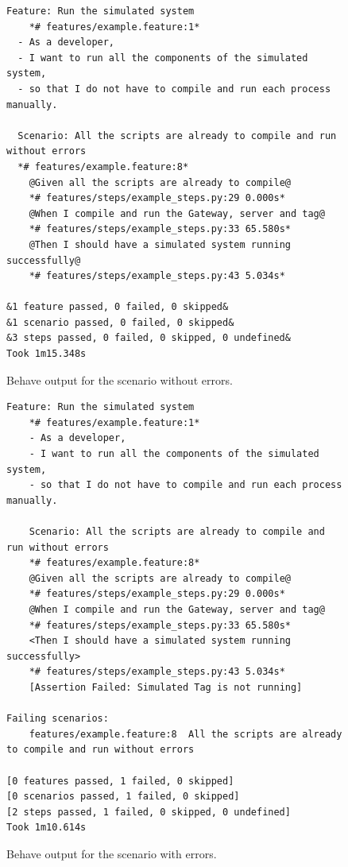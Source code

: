 \documentclass[journal]{IEEEtran}	%
\begin{document}
\begin{figure}[t!]
\centering
\begin{lstlisting}[style=okstyle]
Feature: Run the simulated system 
    *# features/example.feature:1*
  - As a developer,
  - I want to run all the components of the simulated system,
  - so that I do not have to compile and run each process manually.

  Scenario: All the scripts are already to compile and run without errors  
  *# features/example.feature:8*
    @Given all the scripts are already to compile@                           
    *# features/steps/example_steps.py:29 0.000s*
    @When I compile and run the Gateway, server and tag@                    
    *# features/steps/example_steps.py:33 65.580s*
    @Then I should have a simulated system running successfully@             
    *# features/steps/example_steps.py:43 5.034s*

&1 feature passed, 0 failed, 0 skipped&
&1 scenario passed, 0 failed, 0 skipped&
&3 steps passed, 0 failed, 0 skipped, 0 undefined&
Took 1m15.348s
\end{lstlisting}
\caption{Behave output for the scenario without errors.}
\label{fig:behaveOK}
\end{figure}

\begin{figure}[t!]
\centering
\begin{lstlisting}[style=okstyle]
Feature: Run the simulated system 
    *# features/example.feature:1*
    - As a developer,
    - I want to run all the components of the simulated system,
    - so that I do not have to compile and run each process manually.

    Scenario: All the scripts are already to compile and run without errors  
    *# features/example.feature:8*
    @Given all the scripts are already to compile@                          
    *# features/steps/example_steps.py:29 0.000s*
    @When I compile and run the Gateway, server and tag@                     
    *# features/steps/example_steps.py:33 65.580s*
    <Then I should have a simulated system running successfully>         
    *# features/steps/example_steps.py:43 5.034s*
    [Assertion Failed: Simulated Tag is not running]

Failing scenarios:
    features/example.feature:8  All the scripts are already to compile and run without errors
    
[0 features passed, 1 failed, 0 skipped]
[0 scenarios passed, 1 failed, 0 skipped]
[2 steps passed, 1 failed, 0 skipped, 0 undefined]
Took 1m10.614s
\end{lstlisting}
\caption{Behave output for the scenario with errors.}
\label{fig:behaveBAD}
\end{figure}
\end{document}
